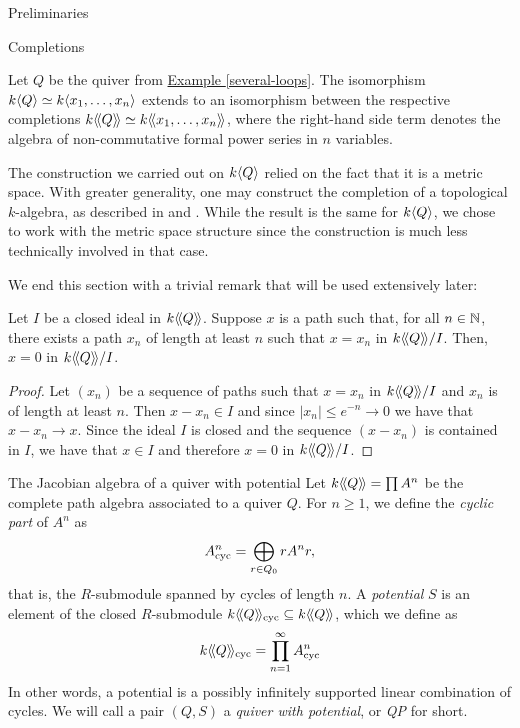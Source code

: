 \begin{chapter}{Preliminaries}
\begin{section}{Completions}
\begin{exmp}Let $Q$ be the quiver from \hyperref[several-loops]{Example \ref*{several-loops}}. The isomorphism $k\langle Q\rangle\simeq k\langle x_1,\dots,x_n\rangle$ extends to an isomorphism between the respective completions $k\langle\!\langle Q\rangle\!\rangle\simeq k\langle\!\langle x_1,\dots,x_n\rangle\!\rangle$, where the right-hand side term denotes the algebra of non-commutative formal power series in $n$ variables.
\end{exmp}

The construction we carried out on $k\langle Q\rangle$ relied on the fact that it is a metric space. With greater generality, one may construct the completion of a topological $k$-algebra, as described in \cite{AM69} and \cite{Bou98}. While the result is the same for $k\langle Q\rangle$, we chose to work with the metric space structure since the construction is much less technically involved in that case.

We end this section with a trivial remark that will be used extensively later:

\begin{obs}\label{arbitrarily-long} Let $I$ be a closed ideal in $k\langle\!\langle Q\rangle\!\rangle$. Suppose $x$ is a path such that, for all $n\in \mathbb{N}$, there exists a path $x_n$ of length at least $n$ such that $x=x_n$ in $k\langle\!\langle Q\rangle\!\rangle/I$. Then, $x=0$ in $k\langle\!\langle Q\rangle\!\rangle/I$.
\end{obs}
\begin{proof} Let $(x_n)$ be a sequence of paths such that $x=x_n$ in $k\langle\!\langle Q\rangle\!\rangle/I$ and $x_n$ is of length at least $n$. Then $x-x_n\in I$ and since $|x_n|\leq e^{-n}\to 0$ we have that $x-x_n\to x$. Since the ideal $I$ is closed and the sequence $(x-x_n)$ is contained in $I$, we have that $x\in I$ and therefore $x=0$ in $k\langle\!\langle Q\rangle\!\rangle/I$.
\end{proof}
\end{section}

\begin{section}{The Jacobian algebra of a quiver with potential}
Let $k\langle\!\langle Q\rangle\!\rangle=\prod A^n$ be the complete path algebra associated to a quiver $Q$. For $n\geq 1$, we define the \emph{cyclic part} of $A^n$ as
\[
A^n_{\mathrm{cyc}} = \bigoplus_{r\in Q_0} rA^nr,
\]
that is, the $R$-submodule spanned by cycles of length $n$. A \emph{potential} $S$ is an element of the closed  $R$-submodule $k\langle\!\langle Q\rangle\!\rangle_{\mathrm{cyc}}\subseteq k\langle\!\langle Q\rangle\!\rangle$, which we define as
\[
k\langle\!\langle Q\rangle\!\rangle_{\mathrm{cyc}}=\prod_{n=1}^\infty A^n_{\mathrm{cyc}}
\]
In other words, a potential is a possibly infinitely supported linear combination of cycles. We will call a pair $(Q,S)$ a \emph{quiver with potential}, or \emph{QP} for short.


\end{section}
\end{chapter}
